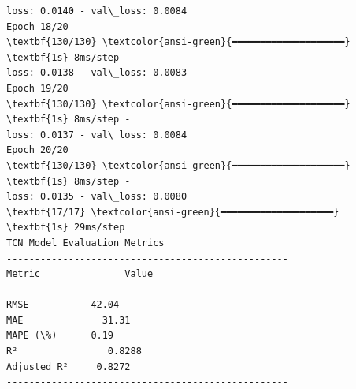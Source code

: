 \documentclass[11pt]{article}
\begin{document}
\begin{Verbatim}[commandchars=\\\{\}]
loss: 0.0140 - val\_loss: 0.0084
Epoch 18/20
\textbf{130/130} \textcolor{ansi-green}{━━━━━━━━━━━━━━━━━━━━} \textbf{1s} 8ms/step -
loss: 0.0138 - val\_loss: 0.0083
Epoch 19/20
\textbf{130/130} \textcolor{ansi-green}{━━━━━━━━━━━━━━━━━━━━} \textbf{1s} 8ms/step -
loss: 0.0137 - val\_loss: 0.0084
Epoch 20/20
\textbf{130/130} \textcolor{ansi-green}{━━━━━━━━━━━━━━━━━━━━} \textbf{1s} 8ms/step -
loss: 0.0135 - val\_loss: 0.0080
\textbf{17/17} \textcolor{ansi-green}{━━━━━━━━━━━━━━━━━━━━} \textbf{1s} 29ms/step
TCN Model Evaluation Metrics
--------------------------------------------------
Metric               Value
--------------------------------------------------
RMSE           42.04
MAE              31.31
MAPE (\%)      0.19
R²                0.8288
Adjusted R²     0.8272
--------------------------------------------------
    \end{Verbatim}

    \begin{center}
    \end{center}
    { \hspace*{\fill} \\}
    
\end{document}
